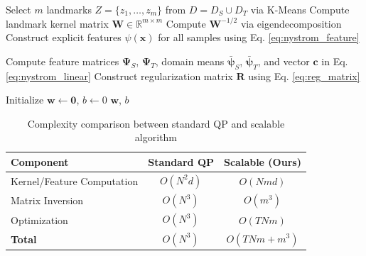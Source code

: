 \documentclass[a4paper]{cas-sc}
\begin{document}
\begin{algorithm}[t]
\caption{TL-QLDMR via Nystr\"{o}m-SGD}
\label{alg:fast_TL-QLDMR}

Select $m$ landmarks $Z = \{z_1, \ldots, z_m\}$ from $D = D_S \cup D_T$ via K-Means\;
Compute landmark kernel matrix $\boldsymbol{W} \in \mathbb{R}^{m \times m}$\;
Compute $\boldsymbol{W}^{-1/2}$ via eigendecomposition\;
Construct explicit features $\psi(\boldsymbol{x})$ for all samples using Eq. \eqref{eq:nystrom_feature}\;

Compute feature matrices $\boldsymbol{\Psi}_S$, $\boldsymbol{\Psi}_T$, domain means $\bar{\boldsymbol{\psi}}_S$, $\bar{\boldsymbol{\psi}}_T$, and vector $\boldsymbol{c}$ in Eq. \eqref{eq:nystrom_linear}\;
Construct regularization matrix $\boldsymbol{R}$ using Eq. \eqref{eq:reg_matrix}\;

Initialize $\boldsymbol{w} \leftarrow \boldsymbol{0}$, $b \leftarrow 0$\;
\Return $\boldsymbol{w}$, $b$\;
\end{algorithm}


\begin{table}[htbp]
\centering
\caption{Complexity comparison between standard QP and scalable algorithm}
\label{tab:complexity}
\begin{tabular}{lcc}
\toprule
\textbf{Component} & \textbf{Standard QP} & \textbf{Scalable (Ours)} \\
\midrule
Kernel/Feature Computation & $O(N^2 d)$ & $O(N m d)$ \\
Matrix Inversion & $O(N^3)$ & $O(m^3)$ \\
Optimization & $O(N^3)$ & $O(T N m)$ \\
\midrule
\textbf{Total} & $O(N^3)$ & $O(T N m + m^3)$ \\
\bottomrule
\end{tabular}
\end{table}
\end{document}

